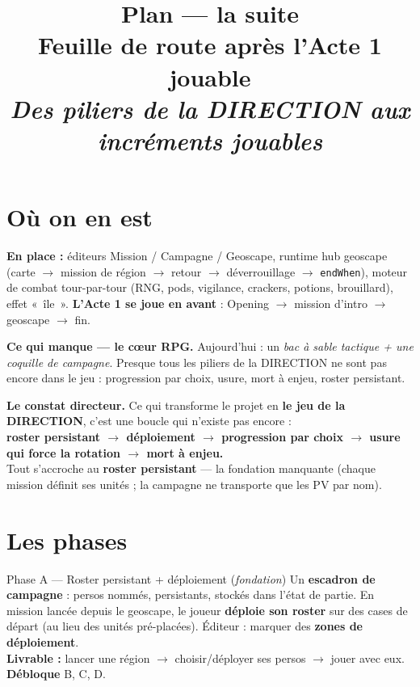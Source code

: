 \documentclass[11pt,a4paper]{article}
\title{\vspace{-1.5em}\textbf{\color{ink}\Huge Plan --- la suite}\\[0.3em]
\large\color{accent}Feuille de route après l'Acte 1 jouable\\[0.2em]
\normalsize\color{ink}\itshape Des piliers de la DIRECTION aux incréments jouables}
\author{}\date{}
\begin{document}
\maketitle
\vspace{-3em}

\section{Où on en est}
\textbf{En place :} éditeurs Mission / Campagne / Geoscape, runtime hub geoscape (carte $\to$ mission de région $\to$ retour $\to$ déverrouillage $\to$ \texttt{endWhen}), moteur de combat tour-par-tour (RNG, pods, vigilance, crackers, potions, brouillard), effet «~île~». \textbf{L'Acte 1 se joue en avant} : Opening $\to$ mission d'intro $\to$ geoscape $\to$ fin.

\smallskip
\textbf{Ce qui manque --- le cœur RPG.} Aujourd'hui : un \emph{bac à sable tactique + une coquille de campagne}. Presque tous les piliers de la DIRECTION ne sont pas encore dans le jeu : progression par choix, usure, mort à enjeu, roster persistant.

\begin{constat}
\textbf{Le constat directeur.} Ce qui transforme le projet en \textbf{le jeu de la DIRECTION}, c'est une boucle qui n'existe pas encore :\\[2pt]
\centering\textbf{roster persistant $\to$ déploiement $\to$ progression par choix $\to$ usure qui force la rotation $\to$ mort à enjeu.}\\[2pt]
\flushleft Tout s'accroche au \textbf{roster persistant} --- la fondation manquante (chaque mission définit ses unités ; la campagne ne transporte que les PV par nom).
\end{constat}

\section{Les phases}

\begin{phase}{Phase A --- Roster persistant + déploiement \textnormal{(\emph{fondation})}}
Un \textbf{escadron de campagne} : persos nommés, persistants, stockés dans l'état de partie. En mission lancée depuis le geoscape, le joueur \textbf{déploie son roster} sur des cases de départ (au lieu des unités pré-placées). Éditeur : marquer des \textbf{zones de déploiement}.\\
\textbf{Livrable :} lancer une région $\to$ choisir/déployer ses persos $\to$ jouer avec eux. \textbf{Débloque} B, C, D.
\end{phase}
\end{document}
